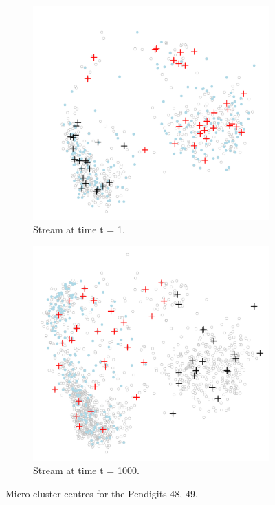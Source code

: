 \begin{figure}[H]
\begin{subfigure}{.5\textwidth}
  \centering
  \includegraphics[width=\textwidth]{evolving_pen/evolving_pen_48_49_1_crop.png}  
  \caption{Stream at time t = 1.}
  \label{fig:stream_1}
\end{subfigure}
\begin{subfigure}{.5\textwidth}
  \centering
  \includegraphics[width=\textwidth]{evolving_pen/evolving_pen_48_49_100_crop.png}  
  \caption{Stream at time t = 1000. }
  \label{fig:stream_1000}
\end{subfigure}
\caption{Micro-cluster centres for the Pendigits 48, 49.}
\label{stream_1_100}
\end{figure}


